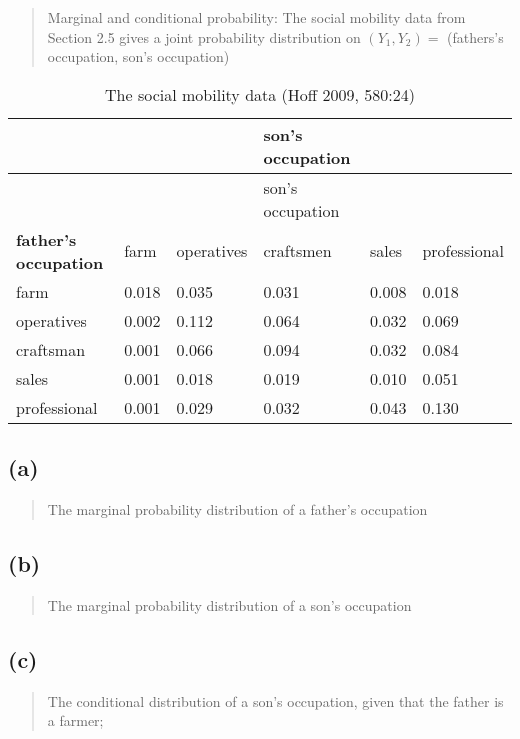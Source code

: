 \documentclass[
  letterpaper,
  DIV=11,
  numbers=noendperiod]{scrreprt}
\begin{document}
\begin{quote}
Marginal and conditional probability: The social mobility data from
Section 2.5 gives a joint probability distribution on \((Y_1, Y_2)=\)
(fathers's occupation, son's occupation)
\end{quote}

\begin{longtable}[]{@{}llllll@{}}
\caption{The social mobility data (Hoff 2009, 580:24)}\tabularnewline
\toprule()
& & & son's occupation & & \\
\midrule()
\endfirsthead
\toprule()
& & & son's occupation & & \\
\midrule()
\endhead
\textbf{father's occupation} & farm & operatives & craftsmen & sales &
professional \\
farm & 0.018 & 0.035 & 0.031 & 0.008 & 0.018 \\
operatives & 0.002 & 0.112 & 0.064 & 0.032 & 0.069 \\
craftsman & 0.001 & 0.066 & 0.094 & 0.032 & 0.084 \\
sales & 0.001 & 0.018 & 0.019 & 0.010 & 0.051 \\
professional & 0.001 & 0.029 & 0.032 & 0.043 & 0.130 \\
\bottomrule()
\end{longtable}

\hypertarget{a}{%
\subsection{(a)}\label{a}}

\begin{quote}
The marginal probability distribution of a father's occupation
\end{quote}

\hypertarget{b}{%
\subsection{(b)}\label{b}}

\begin{quote}
The marginal probability distribution of a son's occupation
\end{quote}

\hypertarget{c}{%
\subsection{(c)}\label{c}}

\begin{quote}
The conditional distribution of a son's occupation, given that the
father is a farmer;
\end{quote}
\end{document}
